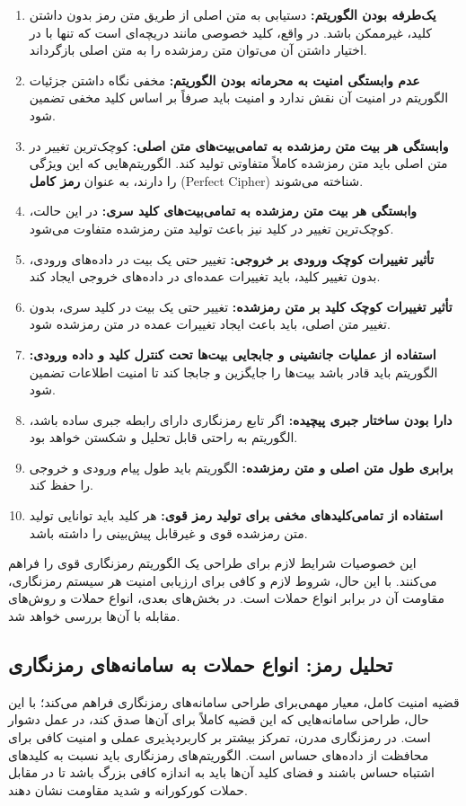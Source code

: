 \documentclass[a4paper,12pt]{report}
\renewcommand{\%}{\lr{\oldpercent}}
\providecommand{\lr}[1]{#1}
\begin{document}
\begin{enumerate}
    \item \textbf{یک‌طرفه بودن الگوریتم:} دستیابی به متن اصلی از طریق متن رمز بدون داشتن کلید، غیرممکن باشد. در واقع، کلید خصوصی مانند دریچه‌ای است که تنها با در اختیار داشتن آن می‌توان متن رمزشده را به متن اصلی بازگرداند.
    \item \textbf{عدم وابستگی امنیت به محرمانه بودن الگوریتم:} مخفی نگاه داشتن جزئیات الگوریتم در امنیت آن نقش ندارد و امنیت باید صرفاً بر اساس کلید مخفی تضمین شود.
    \item \textbf{وابستگی هر بیت متن رمزشده به تمامی‌بیت‌های متن اصلی:} کوچک‌ترین تغییر در متن اصلی باید متن رمزشده کاملاً متفاوتی تولید کند. الگوریتم‌هایی که این ویژگی را دارند، به عنوان \textbf{رمز کامل} (\lr{Perfect Cipher}) شناخته می‌شوند.
    \item \textbf{وابستگی هر بیت متن رمزشده به تمامی‌بیت‌های کلید سری:} در این حالت، کوچک‌ترین تغییر در کلید نیز باعث تولید متن رمزشده متفاوت می‌شود.
    \item \textbf{تأثیر تغییرات کوچک ورودی بر خروجی:} تغییر حتی یک بیت در داده‌های ورودی، بدون تغییر کلید، باید تغییرات عمده‌ای در داده‌های خروجی ایجاد کند.
    \item \textbf{تأثیر تغییرات کوچک کلید بر متن رمزشده:} تغییر حتی یک بیت در کلید سری، بدون تغییر متن اصلی، باید باعث ایجاد تغییرات عمده در متن رمزشده شود.
    \item \textbf{استفاده از عملیات جانشینی و جابجایی بیت‌ها تحت کنترل کلید و داده ورودی:} الگوریتم باید قادر باشد بیت‌ها را جایگزین و جابجا کند تا امنیت اطلاعات تضمین شود.
    \item \textbf{دارا بودن ساختار جبری پیچیده:} اگر تابع رمزنگاری دارای رابطه جبری ساده باشد، الگوریتم به راحتی قابل تحلیل و شکستن خواهد بود.
    \item \textbf{برابری طول متن اصلی و متن رمزشده:} الگوریتم باید طول پیام ورودی و خروجی را حفظ کند.
    \item \textbf{استفاده از تمامی‌کلیدهای مخفی برای تولید رمز قوی:} هر کلید باید توانایی تولید متن رمزشده قوی و غیرقابل پیش‌بینی را داشته باشد.
\end{enumerate}

این خصوصیات شرایط لازم برای طراحی یک الگوریتم رمزنگاری قوی را فراهم می‌کنند. با این حال، شروط لازم و کافی برای ارزیابی امنیت هر سیستم رمزنگاری، مقاومت آن در برابر انواع حملات است. در بخش‌های بعدی، انواع حملات و روش‌های مقابله با آن‌ها بررسی خواهد شد.

\subsection{تحلیل رمز: انواع حملات به سامانه‌های رمزنگاری}
قضیه امنیت کامل، معیار مهمی‌برای طراحی سامانه‌های رمزنگاری فراهم می‌کند؛ با این حال، طراحی سامانه‌هایی که این قضیه کاملاً برای آن‌ها صدق کند، در عمل دشوار است. در رمزنگاری مدرن، تمرکز بیشتر بر کاربردپذیری عملی و امنیت کافی برای محافظت از داده‌های حساس است. الگوریتم‌های رمزنگاری باید نسبت به کلیدهای اشتباه حساس باشند و فضای کلید آن‌ها باید به اندازه کافی بزرگ باشد تا در مقابل حملات کورکورانه و شدید مقاومت نشان دهند\cite{ref34}.
\end{document}
